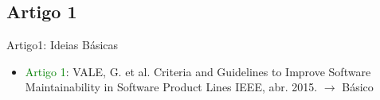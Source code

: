 \subsection{Artigo 1}
\begin{frame}[t, fragile]{Artigo1: Ideias Básicas}
    \begin{itemize}
      \item \textcolor{Green}{Artigo 1}: VALE, G. et al. Criteria and Guidelines to Improve Software Maintainability in Software Product Lines IEEE, abr. 2015. $\rightarrow$ Básico
    \end{itemize}
\end{frame}
